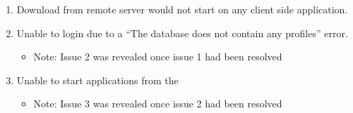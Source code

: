 \begin{enumerate}
    \item Download from remote server would not start on any client side application.
    \item Unable to login due to a ``The database does not contain any profiles'' error.
    \begin{itemize}
        \item Note: Issue 2 was revealed once issue 1 had been resolved
    \end{itemize}
    \item Unable to start applications from the \launcher  
    \begin{itemize}
        \item Note: Issue 3 was revealed once issue 2 had been resolved
    \end{itemize}
\end{enumerate}


